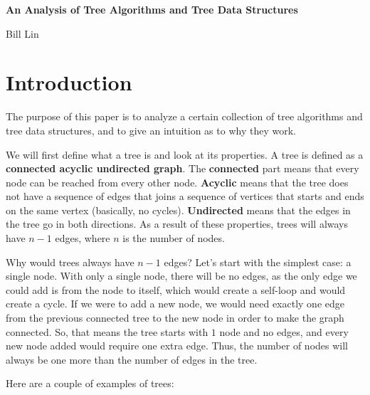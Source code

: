 \documentclass{article}
\begin{document}
\begin{center}
    \Large
    \textbf{An Analysis of Tree Algorithms and Tree Data Structures}
        
    \vspace{0.4cm}
    \large{Bill Lin}
\end{center}

\section{Introduction}

The purpose of this paper is to analyze a certain collection of tree algorithms and tree data structures, and to give an intuition as to why they work.

We will first define what a tree is and look at its properties. A tree is defined as a \textbf{connected acyclic undirected graph}. The \textbf{connected} part means that every node can be reached from every other node. \textbf{Acyclic} means that the tree does not have a sequence of edges that joins a sequence of vertices that starts and ends on the same vertex (basically, no cycles). \textbf{Undirected} means that the edges in the tree go in both directions. As a result of these properties, trees will always have $n - 1$ edges, where $n$ is the number of nodes.

Why would trees always have $n - 1$ edges? Let's start with the simplest case: a single node. With only a single node, there will be no edges, as the only edge we could add is from the node to itself, which would create a self-loop and would create a cycle. If we were to add a new node, we would need exactly one edge from the previous connected tree to the new node in order to make the graph connected. So, that means the tree starts with $1$ node and no edges, and every new node added would require one extra edge. Thus, the number of nodes will always be one more than the number of edges in the tree.

Here are a couple of examples of trees:\\
\end{document}
